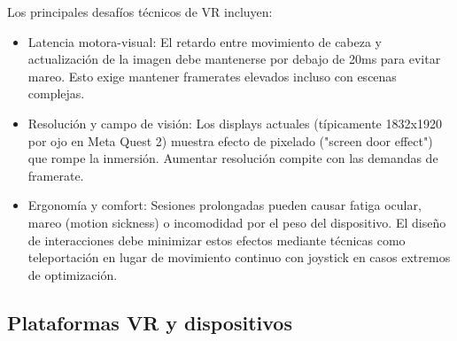Los principales desafíos técnicos de VR incluyen:
\begin{itemize}
\item Latencia motora-visual: El retardo entre movimiento de cabeza y actualización de la imagen debe mantenerse por debajo de 20ms para evitar mareo. Esto exige mantener framerates elevados incluso con escenas complejas.

\item Resolución y campo de visión: Los displays actuales (típicamente 1832x1920 por ojo en Meta Quest 2) muestra efecto de pixelado ("screen door effect") que rompe la inmersión. Aumentar resolución compite con las demandas de framerate.

\item Ergonomía y comfort: Sesiones prolongadas pueden causar fatiga ocular, mareo (motion sickness) o incomodidad por el peso del dispositivo. El diseño de interacciones debe minimizar estos efectos mediante técnicas como teleportación en lugar de movimiento continuo con joystick en casos extremos de optimización.
\end{itemize}
\subsection{Plataformas VR y dispositivos}

